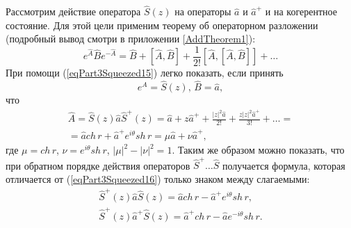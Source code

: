 Рассмотрим действие оператора $\hat{S}\left(z\right)$ на операторы
$\hat{a}$ и $\hat{a}^{+}$ и на когерентное состояние. Для этой цели
применим теорему об операторном разложении (подробный вывод смотри в
приложении \ref{AddTheorem1}): 
\begin{equation}
e^{\hat{A}}\hat{B}e^{-\hat{A}} = 
\hat{B} + \left[\hat{A},\hat{B}\right] + 
\frac{1}{2!} \left[\hat{A},\left[\hat{A},\hat{B}\right]\right] + \dots
\label{eqPart3Squeezed15}
\end{equation}
При помощи (\ref{eqPart3Squeezed15}) легко показать, если принять
\[
e^{\hat{A}} = \hat{S}\left(z\right), \, \hat{B} = \hat{a},
\]
что
\begin{eqnarray}
\hat{A} = \hat{S}\left(z\right)\hat{a}\hat{S}^{+}\left(z\right) =
\hat{a} + z \hat{a}^{+} + \frac{\left|z\right|^2\hat{a}}{2!} +
\frac{z\left|z\right|^2\hat{a}^{+}}{3!} + \dots = 
\nonumber \\
=\hat{a} ch\,r + \hat{a}^{+} e^{i\theta} sh \, r = 
\mu \hat{a} + \nu \hat{a}^{+},
\label{eqPart3Squeezed16}
\end{eqnarray}
где $\mu = ch\,r$, $\nu = e^{i\theta} sh\,r$, $\left|\mu\right|^2 -
\left|\nu\right|^2  = 1$.
Таким же образом можно показать, что при обратном порядке действия
операторов $\hat{S}^{+}\dots\hat{S}$ получается формула, которая
отличается от (\ref{eqPart3Squeezed16}) только знаком между
слагаемыми:
\begin{eqnarray}
\hat{S}^{+}\left(z\right)\hat{a}\hat{S}\left(z\right) 
=\hat{a} ch\,r - \hat{a}^{+} e^{i\theta} sh \, r,
\nonumber \\
\hat{S}^{+}\left(z\right)\hat{a}^{+}\hat{S}\left(z\right) 
=\hat{a}^{+} ch\,r - \hat{a} e^{-i\theta} sh \, r.
\label{eqPart3Squeezed16a}
\end{eqnarray}

